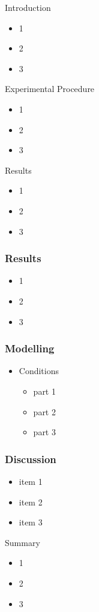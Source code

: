 \documentclass[bigger]{beamer}
\begin{document}
\begin{frame}{Introduction}
\begin{itemize}
\item 1
\item 2
\item 3
\end{itemize}
\end{frame}


\begin{frame}{Experimental Procedure}
\begin{itemize}
\item 1
\item 2
\item 3
\end{itemize}
\end{frame}


\begin{frame}{Results}
\begin{itemize}
\item 1
\item 2
\item 3
\end{itemize}
\end{frame}



\begin{frame}
\frametitle{Results}
\begin{itemize}
\item 1
\item 2
\item 3
\end{itemize}
\end{frame}


\begin{frame}
\frametitle{Modelling}
\begin{itemize}
\item Conditions
\begin{itemize}
\item part 1
\item part 2
\item part 3
\end{itemize}
\end{itemize}
\end{frame}


\begin{frame}
\frametitle{Discussion}
\begin{itemize}
\item item 1
\item item 2
\item item 3
\end{itemize}
\end{frame}



\begin{frame}{Summary}
\begin{itemize}
\item 1
\item 2
\item 3
\end{itemize}
\end{frame}
\end{document}
